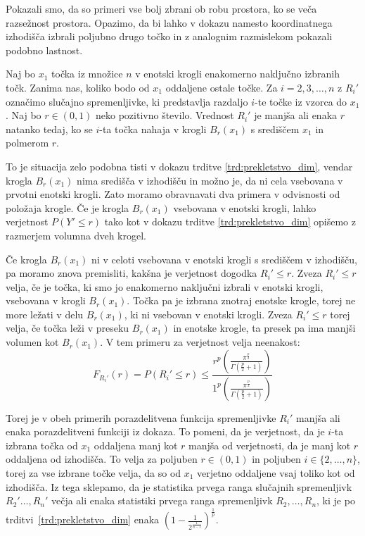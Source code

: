 \documentclass[12pt,a4paper,twoside]{article}
\theoremstyle{definition} %
\theoremstyle{plain} %
\numberwithin{equation}{section}  %
\begin{document}
Pokazali smo, da so primeri vse bolj zbrani ob robu prostora, ko se veča razsežnost prostora. 
Opazimo, da bi lahko v dokazu namesto koordinatnega izhodišča izbrali poljubno drugo točko in z analognim razmislekom pokazali podobno lastnost.

Naj bo $x_1$ točka iz množice $n$ v enotski krogli enakomerno naključno izbranih točk.
Zanima nas, koliko bodo od $x_1$ oddaljene ostale točke. 
Za $i=2,3,\ldots, n$ z $R_i'$ označimo slučajno spremenljivke, ki predstavlja razdaljo $i$-te točke iz vzorca do $x_1$. 
Naj bo $r \in (0,1)$ neko pozitivno število.
Vrednost $R_i'$ je manjša ali enaka $r$ natanko tedaj, ko se $i$-ta točka nahaja v krogli $B_{r}(x_1)$ s središčem $x_1$ in polmerom $r$. 

To je situacija zelo podobna tisti v dokazu trditve \ref{trd:prekletstvo_dim}, vendar krogla $B_{r}(x_1)$ nima središča v izhodišču in možno je, da ni cela vsebovana v prvotni enotski krogli.
Zato moramo obravnavati dva primera v odvisnosti od položaja krogle.
Če je krogla $B_r(x_1)$ vsebovana v enotski krogli, lahko verjetnost $P(Y' \leq r)$ tako kot v dokazu trditve \ref{trd:prekletstvo_dim} opišemo z razmerjem volumna dveh krogel.

Če krogla $B_r(x_1)$ ni v celoti vsebovana v enotski krogli s središčem v izhodišču, pa moramo znova premisliti, kakšna je verjetnost dogodka $R_i' \leq r$.
Zveza $R_i' \leq r$ velja, če je točka, ki smo jo enakomerno naključni izbrali v enotski krogli, vsebovana v krogli $B_r(x_1)$.
Točka pa je izbrana znotraj enotske krogle, torej ne more ležati v delu $B_r(x_1)$, ki ni vsebovan v enotski krogli.
Zveza $R_i' \leq r$ torej velja, če točka leži v preseku $B_r(x_1)$ in enotske krogle, ta presek pa ima manjši volumen kot $B_r(x_1)$.
V tem primeru za verjetnost velja neenakost:
\begin{equation}
\label{eq:presek_krogel}
	F_{R_i'}(r) = P(R_i' \leq r) \leq 
	\frac{r^p \left( \frac{\pi^{\frac{p}{2}}}{\Gamma (\frac{p}{2}+1)} \right)}{1^p \left( \frac{\pi^{\frac{p}{2}}}{\Gamma (\frac{p}{2}+1)} \right)}
\end{equation}

Torej je v obeh primerih porazdelitvena funkcija spremenljivke $R_i'$ manjša ali enaka porazdelitveni funkciji iz dokaza.
To pomeni, da je verjetnost, da je $i$-ta izbrana točka od $x_1$ oddaljena manj kot $r$ manjša od verjetnosti, da je manj kot $r$ oddaljena od izhodišča.
To velja za poljuben $r \in (0,1)$ in poljuben $i \in \{2,\ldots,n\}$, torej za vse izbrane točke velja, da so od $x_1$ verjetno oddaljene vsaj toliko kot od izhodišča.
Iz tega sklepamo, da je statistika prvega ranga slučajnih spremenljivk $R_2'\ldots, R_n'$ večja ali enaka statistiki prvega ranga spremenljivk $R_2,\ldots,R_n$, ki je po trditvi~\ref{trd:prekletstvo_dim} enaka $(1 - \frac{1}{2^{\frac{1}{n-1}}})^{\frac{1}{p}}$.
\end{document}
